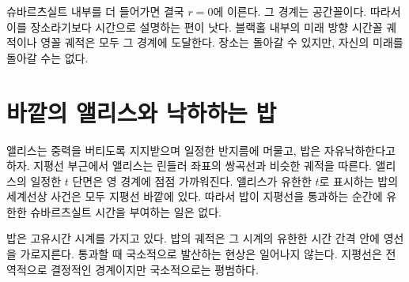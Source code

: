 슈바르츠실트 내부를 더 들어가면 결국 \(r=0\)에 이른다. 그 경계는 공간꼴이다. 따라서 이를 장소라기보다 시간으로 설명하는 편이 낫다. 블랙홀 내부의 미래 방향 시간꼴 궤적이나 영꼴 궤적은 모두 그 경계에 도달한다. 장소는 돌아갈 수 있지만, 자신의 미래를 돌아갈 수는 없다.

\begin{classroomqa}
\end{classroomqa}

\begin{classroomqa}
\end{classroomqa}

\section{바깥의 앨리스와 낙하하는 밥}

앨리스는 중력을 버티도록 지지받으며 일정한 반지름에 머물고, 밥은 자유낙하한다고 하자. 지평선 부근에서 앨리스는 린들러 좌표의 쌍곡선과 비슷한 궤적을 따른다. 앨리스의 일정한 \(t\) 단면은 영 경계에 점점 가까워진다. 앨리스가 유한한 \(t\)로 표시하는 밥의 세계선상 사건은 모두 지평선 바깥에 있다. 따라서 밥이 지평선을 통과하는 순간에 유한한 슈바르츠실트 시간을 부여하는 일은 없다.

밥은 고유시간 시계를 가지고 있다. 밥의 궤적은 그 시계의 유한한 시간 간격 안에 영선을 가로지른다. 통과할 때 국소적으로 발산하는 현상은 일어나지 않는다. 지평선은 전역적으로 결정적인 경계이지만 국소적으로는 평범하다.

